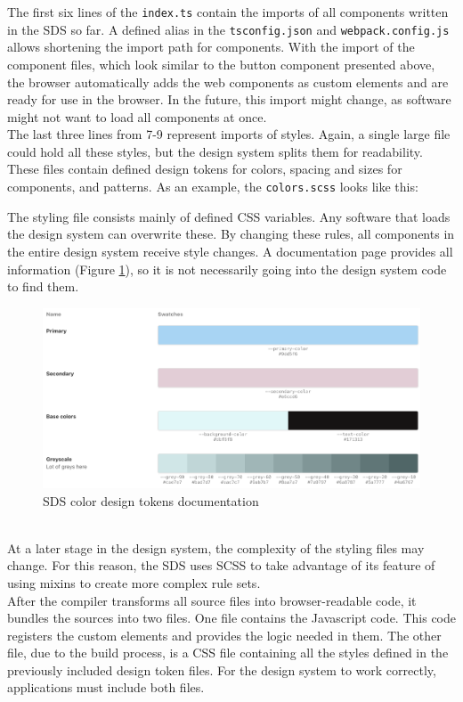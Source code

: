 
The first six lines of the \texttt{index.ts} contain the imports of all components written in the \ac{SDS} so far. A defined alias in the \texttt{tsconfig.json} and \texttt{webpack.config.js} allows shortening the import path for components. With the import of the component files, which look similar to the button component presented above, the browser automatically adds the web components as custom elements and are ready for use in the browser. In the future, this import might change, as software might not want to load all components at once. \\
The last three lines from 7-9 represent imports of styles. Again, a single large file could hold all these styles, but the design system splits them for readability. These files contain defined design tokens for colors, spacing and sizes for components, and patterns. As an example, the \texttt{colors.scss} looks like this:

The styling file consists mainly of defined \ac{CSS} variables. Any software that loads the design system can overwrite these. By changing these rules, all components in the entire design system receive style changes. A documentation page provides all information (Figure \ref{sds_color_design_tokens}), so it is not necessarily going into the design system code to find them.
\begin{figure}[htbp]
    \centerline{\includegraphics[width=\linewidth]{images/color_design_tokens.png}}
    \caption{\ac{SDS} color design tokens documentation}
    \label{sds_color_design_tokens}
\end{figure} \\
At a later stage in the design system, the complexity of the styling files may change. For this reason, the \ac{SDS} uses \ac{SCSS} to take advantage of its feature of using mixins to create more complex rule sets.\citep{scss_sass_nodate} \\
After the compiler transforms all source files into browser-readable code, it bundles the sources into two files. One file contains the Javascript code. This code registers the custom elements and provides the logic needed in them. The other file, due to the build process, is a \ac{CSS} file containing all the styles defined in the previously included design token files. For the design system to work correctly, applications must include both files. \\

